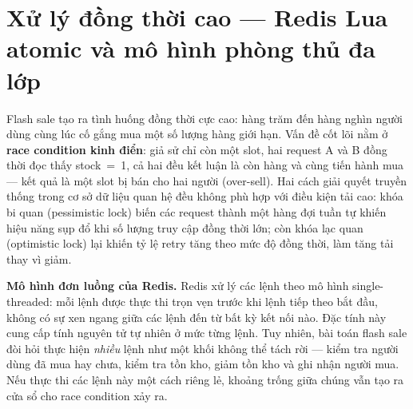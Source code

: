 \documentclass[../DoAn.tex]{subfiles}
\begin{document}

\section{Xử lý đồng thời cao --- Redis Lua atomic và mô hình phòng thủ đa lớp}
\label{section:2.5}

Flash sale tạo ra tình huống đồng thời cực cao: hàng trăm đến hàng nghìn người dùng cùng lúc
cố gắng mua một số lượng hàng giới hạn. Vấn đề cốt lõi nằm ở \textbf{race condition kinh
điển}: giả sử chỉ còn một slot, hai request A và B đồng thời đọc thấy stock~=~1, cả hai đều
kết luận là còn hàng và cùng tiến hành mua --- kết quả là một slot bị bán cho hai người
(over-sell). Hai cách giải quyết truyền thống trong cơ sở dữ liệu quan hệ đều không phù hợp
với điều kiện tải cao: khóa bi quan (pessimistic lock) biến các request thành một hàng đợi
tuần tự khiến hiệu năng sụp đổ khi số lượng truy cập đồng thời lớn; còn khóa lạc quan
(optimistic lock) lại khiến tỷ lệ retry tăng theo mức độ đồng thời, làm tăng tải thay vì
giảm.

\textbf{Mô hình đơn luồng của Redis.} Redis xử lý các lệnh theo mô hình single-threaded: mỗi
lệnh được thực thi trọn vẹn trước khi lệnh tiếp theo bắt đầu, không có sự xen ngang giữa các
lệnh đến từ bất kỳ kết nối nào. Đặc tính này cung cấp tính nguyên tử tự nhiên ở mức từng
lệnh. Tuy nhiên, bài toán flash sale đòi hỏi thực hiện \textit{nhiều} lệnh như một khối không
thể tách rời --- kiểm tra người dùng đã mua hay chưa, kiểm tra tồn kho, giảm tồn kho và ghi
nhận người mua. Nếu thực thi các lệnh này một cách riêng lẻ, khoảng trống giữa chúng vẫn tạo
ra cửa sổ cho race condition xảy ra.
\end{document}
